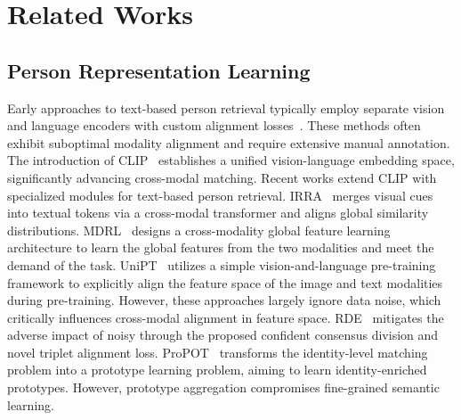 \section{Related Works}

\subsection{Person Representation Learning}
Early approaches to text-based person retrieval typically employ separate vision and language encoders with custom alignment losses~\cite{zheng2020dual, si2018dual}. These methods often exhibit suboptimal modality alignment and require extensive manual annotation. The introduction of CLIP~\cite{radford2021learning} establishes a unified vision-language embedding space, significantly advancing cross-modal matching. Recent works extend CLIP with specialized modules for text-based person retrieval. IRRA~\cite{jiang2023cross} merges visual cues into textual tokens via a cross-modal transformer and aligns global similarity distributions. MDRL~\cite{yang2024multi} designs a cross-modality global feature learning architecture to learn the global features from the two modalities and meet the demand of the task. UniPT~\cite{shao2023unified} utilizes a simple vision-and-language pre-training framework to explicitly align the feature space of the image and text modalities during pre-training. However, these approaches largely ignore data noise, which critically influences cross-modal alignment in feature space. RDE~\cite{qin2024noisy} mitigates the adverse impact of noisy through the proposed confident consensus division and novel triplet alignment loss. ProPOT~\cite{yan2024prototypical} transforms the identity-level matching problem into a prototype learning problem, aiming to learn identity-enriched prototypes. However, prototype aggregation compromises fine-grained semantic learning.



